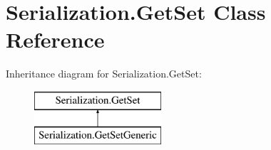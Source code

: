 \hypertarget{class_serialization_1_1_get_set}{}\section{Serialization.\+Get\+Set Class Reference}
\label{class_serialization_1_1_get_set}
Inheritance diagram for Serialization.\+Get\+Set\+:\begin{figure}[H]
\begin{center}
\leavevmode
\includegraphics[height=2.000000cm]{class_serialization_1_1_get_set}
\end{center}
\end{figure}
